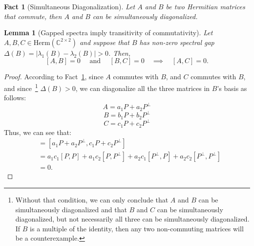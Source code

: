 \documentclass[11pt]{article}
\theoremstyle{plain}
\newtheorem{lemma}[theorem]{Lemma}
\newtheorem{fact}[theorem]{Fact}
\begin{document}
\begin{fact}[Simultaneous Diagonalization]\label{fact:sim-diag}
    Let $A$ and $B$ be two Hermitian matrices that commute, then $A$ and $B$ can be simultaneously diagonalized.
\end{fact}

\begin{lemma}[Gapped spectra imply transitivity of commutativity]\label{lem:transitivity}
Let $A,B,C \in \mathrm{Herm}(\mathbb{C}^{2 \times 2})$ and suppose that $B$ has non-zero spectral gap $\Delta(B)=|\lambda_1(B) - \lambda_2(B)| > 0$. Then, 
$$
[A,B] = 0 \quad \text{ and } \quad [B,C] = 0 \quad \implies \quad [A,C]=0.
$$
\end{lemma}
\begin{proof}
According to Fact~\ref{fact:sim-diag}, since $A$ commutes with $B$, and $C$ commutes with $B$, and since~\footnote{Without that condition, we can only conclude that $A$ and $B$ can be simultaneously diagonalized and that $B$ and $C$ can be simultaneously diagonalized, but not necessarily all three can be simultaneously diagonalized. If $B$ is a multiple of the identity, then any two non-commuting matrices will be a counterexample.} $\Delta(B) > 0$, we can diagonalize all the three matrices in $B$'s basis as follows:
\begin{equation}
    A = a_1 P + a_2 P^\bot
\end{equation}
\begin{equation}
    B = b_1 P + b_2 P^\bot
\end{equation}
\begin{equation}
    C = c_1 P + c_2 P^\bot
\end{equation}
Thus, we can see that:
\begin{align*}
    [A, C] &= \left[a_1 P + a_2 P^\bot,  c_1 P + c_2 P^\bot\right]\\
    &= a_1c_1 [P, P] + a_1 c_2 [P, P^\bot] + a_2 c_1 [P^\bot, P] + a_2 c_2 [P^\bot, P^\bot]\\
    &= 0.
\end{align*}
\end{proof}
\end{document}
